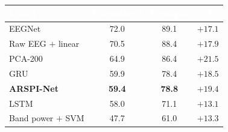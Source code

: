 \documentclass[border=10pt]{standalone}
\begin{document}
{\sffamily\fontsize{20}{26}\selectfont
\setlength{\arrayrulewidth}{1pt}\renewcommand{\arraystretch}{1.4}
\begin{tabular}{l c c c}
\toprule
\rowcolor{sbnavy}\textbf{\textcolor{white}{Model}} & \textbf{\textcolor{white}{Uncentered}} & \textbf{\textcolor{white}{Centered}} & \textbf{\textcolor{white}{$\Delta$}}\\
\midrule
EEGNet              & 72.0 & 89.1 & $+17.1$\\
Raw EEG $+$ linear  & 70.5 & 88.4 & $+17.9$\\
PCA-200             & 64.9 & 86.4 & $+21.5$\\
GRU                 & 59.9 & 78.4 & $+18.5$\\
\rowcolor{sbaccent!22}\textbf{ARSPI-Net} & \textbf{59.4} & \textbf{78.8} & $\mathbf{+19.4}$\\
LSTM                & 58.0 & 71.1 & $+13.1$\\
Band power $+$ SVM  & 47.7 & 61.0 & $+13.3$\\
\bottomrule
\end{tabular}}
\end{document}
